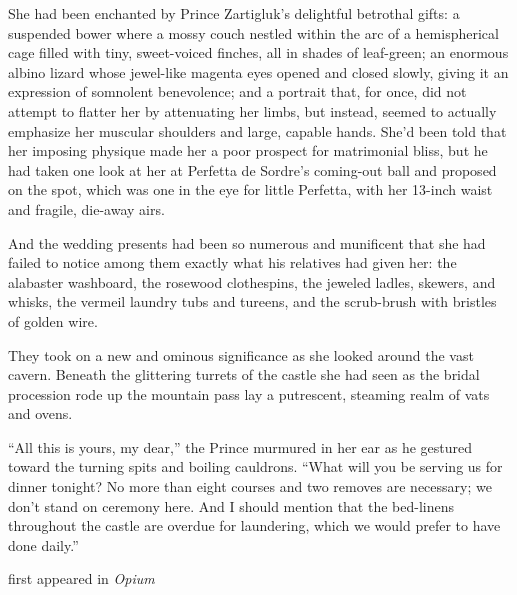 She had been enchanted by Prince Zartigluk's delightful betrothal gifts:
a suspended bower where a mossy couch nestled within the arc of a
hemispherical cage filled with tiny, sweet-voiced finches, all in shades
of leaf-green; an enormous albino lizard whose jewel-like magenta eyes
opened and closed slowly, giving it an expression of somnolent
benevolence; and a portrait that, for once, did not attempt to flatter
her by attenuating her limbs, but instead, seemed to actually emphasize
her muscular shoulders and large, capable hands. She'd been told that
her imposing physique made her a poor prospect for matrimonial bliss,
but he had taken one look at her at Perfetta de Sordre's coming-out ball
and proposed on the spot, which was one in the eye for little Perfetta,
with her 13-inch waist and fragile, die-away airs.

And the wedding presents had been so numerous and munificent that she
had failed to notice among them exactly what his relatives had given
her: the alabaster washboard, the rosewood clothespins, the jeweled
ladles, skewers, and whisks, the vermeil laundry tubs and tureens, and
the scrub-brush with bristles of golden wire.

They took on a new and ominous significance as she looked around the
vast cavern. Beneath the glittering turrets of the castle she had seen
as the bridal procession rode up the mountain pass lay a putrescent,
steaming realm of vats and ovens.

``All this is yours, my dear,'' the Prince murmured in her ear as he
gestured toward the turning spits and boiling cauldrons. ``What will you
be serving us for dinner tonight? No more than eight courses and two
removes are necessary; we don't stand on ceremony here. And I should
mention that the bed-linens throughout the castle are overdue for
laundering, which we would prefer to have done daily.''

first appeared in \emph{Opium}
